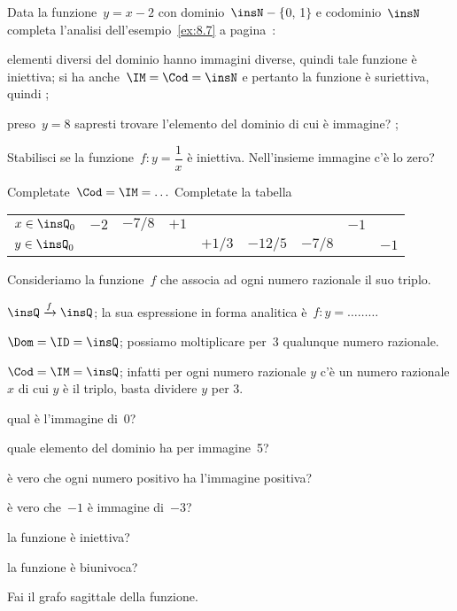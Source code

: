 
\begin{esercizio}
 \label{ese:\thechapter.7}
Data la funzione~$y=x-2$ con dominio~$\insN-\{$0, 1$\}$ e codominio~$\insN$ completa l'analisi dell'esempio~\ref{ex:8.7} a pagina~\pageref{ex:8.7}:
\begin{enumeratea}
\item elementi diversi del dominio hanno immagini diverse, quindi tale funzione è iniettiva;
si ha anche~$\IM =\Cod= \insN$ e pertanto la funzione è suriettiva, quindi \dotfill;
\item preso~$y = 8$ sapresti trovare l'elemento del dominio di cui è immagine? \dotfill;
\end{enumeratea}
\end{esercizio}

\begin{esercizio}
 \label{ese:\thechapter.8}
Stabilisci se la funzione~$f:y=\dfrac{1}{x}$ è
iniettiva. Nell'insieme immagine c'è lo zero?

Completate~$\Cod = \IM =\ldots$
Completate la tabella
\begin{center}
\begin{tabular}{l*8{c}}
\toprule
$x\in \insQ_{0}$ & $-2$ & $-7/8$ & $+1$ & & & & $-1$ & \\
$y\in \insQ_{0}$ & & & & $+1/3$ & $-12/5$ & $-7/8$ & & $-1$\\
\bottomrule
\end{tabular}
\end{center}
\end{esercizio}

\begin{esercizio}
 \label{ese:\thechapter.9}
Consideriamo la funzione~$f$ che associa ad ogni numero razionale il suo triplo.

$\insQ\xrightarrow{f}\insQ$; la sua espressione in forma
analitica è~$f: y = \dots\dots\dots$

$\Dom = \ID = \insQ$; possiamo moltiplicare per~3 qualunque numero razionale.

$\Cod = \IM =\insQ$; infatti per ogni numero razionale $y$ c'è un numero razionale $x$ di cui $y$ è il triplo, basta dividere $y$ per 3.
%

\begin{enumeratea}
\item qual è l'immagine di~0?\dotfill
\item quale elemento del dominio ha per immagine~5?\dotfill
\item è vero che ogni numero positivo ha l'immagine positiva?\dotfill
\item è vero che~$-1$ è immagine di~$-3$?\dotfill
\item la funzione è iniettiva?\dotfill
\item la funzione è biunivoca?\dotfill
\end{enumeratea}
Fai il grafo sagittale della funzione.
\end{esercizio}

